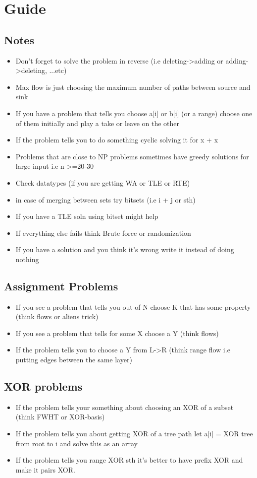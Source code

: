 \section{Guide}
\subsection{Notes}
\begin{itemize}
\item Don't forget to solve the problem in reverse (i.e deleting->adding or adding->deleting, ...etc)
\item Max flow is just choosing the maximum number of paths between source and sink
\item If you have a problem that tells you choose a[i] or b[i] (or a range) choose one of them initially and play a take or leave on the other
\item If the problem tells you to do something cyclic solving it for x + x
\item Problems that are close to NP problems sometimes have greedy solutions for large input i.e n >=20-30
\item Check datatypes (if you are getting WA or TLE or RTE)
\item in case of merging between sets try bitsets (i.e i + j or sth)
\item If you have a TLE soln using bitset might help
\item If everything else fails think Brute force or randomization
\item If you have a solution and you think it's wrong write it instead of doing nothing
\end{itemize}
\hrulefill
\subsection{Assignment Problems}
\begin{itemize}
\item If you see a problem that tells you out of N choose K that has some property (think flows or aliens trick)
\item If you see a problem that tells for some X choose a Y (think flows)
\item If the problem tells you to choose a Y from L->R (think range flow i.e putting edges between the same layer)
\end{itemize}
\hrulefill
\subsection{XOR problems}
\begin{itemize}
\item If the problem tells your something about choosing an XOR of a subset (think FWHT or XOR-basis)
\item If the problem tells you about getting XOR of a tree path let a[i] = XOR tree from root to i and solve this as an array
\item If the problem tells you range XOR sth it's better to have prefix XOR and make it pairs XOR.
\end{itemize}
\hrulefill
